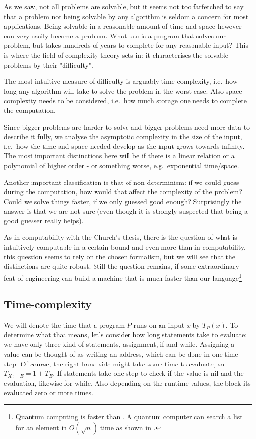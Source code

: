 As we saw, not all problems are solvable, but it seems not too farfetched to
say that a problem not being solvable by any algorithm is seldom a concern for
most applications. Being solvable in a reasonable amount of time and space
however can very easily become a problem. What use is a program that solves our
problem, but takes hundreds of years to complete for any reasonable input? This
is where the field of complexity theory sets in: it characterises the solvable
problems by their "difficulty".

The most intuitive measure of difficulty is arguably time-complexity, i.e.\ how
long any algorithm will take to solve the problem in the worst case. Also
space-complexity needs to be considered, i.e.\ how much storage one needs to
complete the computation.

Since bigger problems are harder to solve and bigger problems need more data to
describe it fully, we analyse the asymptotic complexity in the size of the
input, i.e.\ how the time and space needed develop as the input grows towards
infinity. The most important distinctions here will be if there is a linear
relation or a polynomial of higher order - or something worse, e.g.\ exponential
time/space.

Another important classification is that of non-determinism: if we could guess
during the computation, how would that affect the complexity of the problem?
Could we solve things faster, if we only guessed good enough? Surprisingly the
answer is that we are not sure (even though it is strongly suspected that being
a good guesser really helps).

As in computability with the Church's thesis, there is the question of what is
intuitively computable in a certain bound and even more than in computability,
this question seems to rely on the chosen formalism, but we will see that the
distinctions are quite robust. Still the question remains, if some
extraordinary feat of engineering can build a machine that is much faster than
our \WHILE language\footnote{Quantum computing is faster than \WHILE. A 
	quantum computer can search a list for an element in $O(\sqrt{n})$ time as 
	shown in \cite{grover1996fast}.}

\subsection{Time-complexity}
We will denote the time that a program $P$ runs on an input $x$ by $T_P(x)$. To
determine what that means, let's consider how long statements take to evaluate: we
have only three kind of statements, assignment, if and while. Assigning a value
can be thought of as writing an address, which can be done in one time-step. Of
course, the right hand side might take some time to evaluate, so $T_{X := E} = 1
+ T_E$. If statements take one step to check if the value is nil and the
evaluation, likewise for while. Also depending on the runtime values, the block
its evaluated zero or more times.

